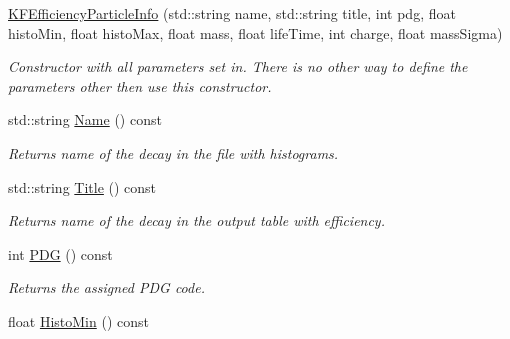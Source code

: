 \begin{DoxyCompactItemize}
\item 
\hyperlink{classKFEfficiencyParticleInfo_a20377d0abc5f6bf03603ab1bf296f2ae}{K\+F\+Efficiency\+Particle\+Info} (std\+::string name, std\+::string title, int pdg, float histo\+Min, float histo\+Max, float mass, float life\+Time, int charge, float mass\+Sigma)\hypertarget{classKFEfficiencyParticleInfo_a20377d0abc5f6bf03603ab1bf296f2ae}{}\label{classKFEfficiencyParticleInfo_a20377d0abc5f6bf03603ab1bf296f2ae}

\begin{DoxyCompactList}\small\item\em Constructor with all parameters set in. There is no other way to define the parameters other then use this constructor. \end{DoxyCompactList}\item 
std\+::string \hyperlink{classKFEfficiencyParticleInfo_a517f4dc2cc4b876af682b05c5138e9bf}{Name} () const \hypertarget{classKFEfficiencyParticleInfo_a517f4dc2cc4b876af682b05c5138e9bf}{}\label{classKFEfficiencyParticleInfo_a517f4dc2cc4b876af682b05c5138e9bf}

\begin{DoxyCompactList}\small\item\em Returns name of the decay in the file with histograms. \end{DoxyCompactList}\item 
std\+::string \hyperlink{classKFEfficiencyParticleInfo_a4d5b802258b32925c890d9e8feb22b6f}{Title} () const \hypertarget{classKFEfficiencyParticleInfo_a4d5b802258b32925c890d9e8feb22b6f}{}\label{classKFEfficiencyParticleInfo_a4d5b802258b32925c890d9e8feb22b6f}

\begin{DoxyCompactList}\small\item\em Returns name of the decay in the output table with efficiency. \end{DoxyCompactList}\item 
int \hyperlink{classKFEfficiencyParticleInfo_aba5e25b80f6cd793d9234c4421e86904}{P\+DG} () const \hypertarget{classKFEfficiencyParticleInfo_aba5e25b80f6cd793d9234c4421e86904}{}\label{classKFEfficiencyParticleInfo_aba5e25b80f6cd793d9234c4421e86904}

\begin{DoxyCompactList}\small\item\em Returns the assigned P\+DG code. \end{DoxyCompactList}\item 
float \hyperlink{classKFEfficiencyParticleInfo_a76caa591241e85107d99366489fee56d}{Histo\+Min} () const \hypertarget{classKFEfficiencyParticleInfo_a76caa591241e85107d99366489fee56d}{}\label{classKFEfficiencyParticleInfo_a76caa591241e85107d99366489fee56d}


\end{DoxyCompactItemize}
